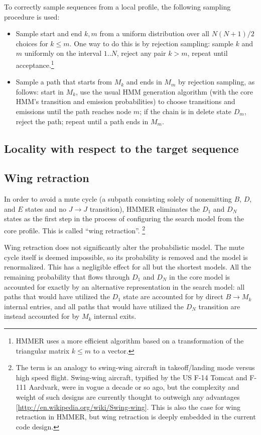 \documentclass[11pt]{article}
\begin{document}
To correctly sample sequences from a local profile, the following
sampling procedure is used:

\begin{itemize}
\item Sample start and end $k,m$ from a uniform distribution over all
      $N(N+1)/2$ choices for $k \leq m$.  One way to do this is by
      rejection sampling: sample $k$ and $m$ uniformly on the interval
      $1..N$, reject any pair $k>m$, repeat until acceptance.\footnote{HMMER
      uses a more efficient algorithm based on a transformation of the
      triangular matrix $k \leq m$ to a vector.}

\item Sample a path that starts from $M_k$ and ends in $M_m$ by
      rejection sampling, as follows: start in $M_k$, use the usual
      HMM generation algorithm (with the core HMM's transition and
      emission probabilities) to choose transitions and emissions
      until the path reaches node $m$; if the chain is in delete state
      $D_m$, reject the path; repeat until a path ends in $M_m$.
\end{itemize}


\subsection{Locality with respect to the target sequence}


\subsection{Wing retraction}

In order to avoid a mute cycle (a subpath consisting solely of
nonemitting $B$, $D$, and $E$ states and no $J \rightarrow J$
transition), HMMER eliminates the $D_1$ and $D_N$ states as the first
step in the process of configuring the search model from the core
profile. This is called ``wing retraction''. 
\footnote{The term is an analogy to swing-wing aircraft in
takeoff/landing mode versus high speed flight. Swing-wing aircraft,
typified by the US F-14 Tomcat and F-111 Aardvark, were in vogue a
decade or so ago, but the complexity and weight of such designs are
currently thought to outweigh any advantages
[\url{http://en.wikipedia.org/wiki/Swing-wing}]. This is also the case
for wing retraction in HMMER, but wing retraction is deeply embedded
in the current code design.}

Wing retraction does not significantly alter the probabilistic
model. The mute cycle itself is deemed impossible, so its probability
is removed and the model is renormalized. This has a negligible effect
for all but the shortest models. All the remaining probability that
flows through $D_1$ and $D_N$ in the core model is accounted for
exactly by an alternative representation in the search model: all
paths that would have utilized the $D_1$ state are accounted for by
direct $B \rightarrow M_k$ internal entries, and all paths that would
have utilized the $D_N$ transition are instead accounted for by $M_k$
internal exits.
\end{document}
